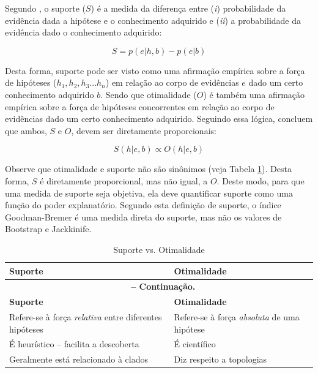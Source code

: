 \begin{refsection}
Segundo \textcite{Popper1959}, o suporte ($S$) é a medida da diferença entre (\textit{i}) probabilidade da evidência dada a hipótese e o conhecimento adquirido e (\textit{ii}) a probabilidade da evidência dado o conhecimento adquirido:

\begin{center}
\begin{equation}
S=p(e|h,b)-p(e|b)
\end{equation}
\end{center}

Desta forma, suporte pode ser visto como uma afirmação empírica sobre a força de hipóteses ($ h_1, h_2, h_3 ... h_n $) em relação ao corpo de evidências $e$ dado um certo conhecimento adquirido $b$. Sendo que otimalidade ($O$) é também uma afirmação empírica sobre a força de hipóteses concorrentes em relação ao corpo de evidências dado um certo conhecimento adquirido. Seguindo essa lógica, \textcite{GrantKluge2008b} concluem que ambos, $S$ e $O$, devem ser diretamente proporcionais:

\begin{center}
\begin{equation}
S(h|e,b) \propto O(h|e,b)
\end{equation}
\end{center}


Observe que otimalidade e suporte não são sinônimos (veja Tabela \ref{tut14:table:SvsO}). Desta forma, $S$ é diretamente proporcional, mas não igual, a $O$. Deste modo, para que uma medida de suporte seja objetiva, ela deve quantificar suporte como uma função do poder explanatório. Segundo esta definição de suporte, o índice Goodman-Bremer é uma medida direta do suporte, mas não os valores de Bootstrap e Jackkinife.\\

\begin{center}
\begin{longtable}{ll}
\caption[]{Suporte vs. Otimalidade} \label{tut14:table:SvsO} \\
\toprule
\textbf{Suporte} & \textbf{Otimalidade} \\
\endfirsthead
\multicolumn{2}{c}{{\bfseries \tablename\ \thetable{} -- Continuação.}}\\
\toprule
\textbf{Suporte} & \textbf{Otimalidade} \\
\endhead
\endlastfoot
\midrule
Refere-se à força \textit{relativa} entre diferentes hipóteses & Refere-se à força \textit{absoluta} de uma hipótese \\
É heurístico -- facilita a descoberta & É científico \\
Geralmente está relacionado à clados & Diz respeito a topologias \\
\bottomrule
\end{longtable}
\end{center}



\end{refsection}

